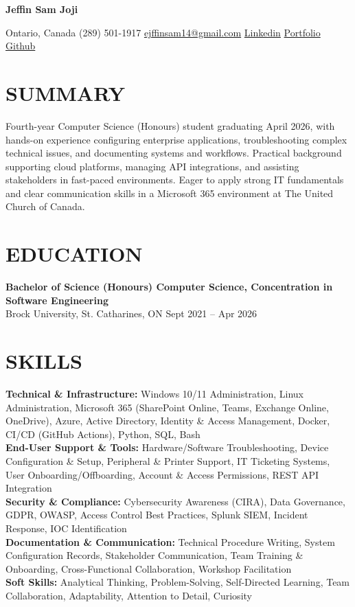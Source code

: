 \documentclass[11pt]{article}
\begin{document}
\begin{center}
    {\Huge \textbf{Jeffin Sam Joji}}

 Ontario, Canada \textbar{} (289) 501-1917 \textbar{} \href{mailto:ejffinsam14@gmail.com}{ejffinsam14@gmail.com} \textbar{} \href{https://linkedin.com/in/jeffin-sam-joji}{Linkedin} \textbar{} \href{https://jeff13in.github.io/Portfolio/}{Portfolio} \textbar{} \href{https://github.com/jeff13in}{Github}
\end{center}

\section*{SUMMARY}
Fourth-year Computer Science (Honours) student graduating April 2026, with hands-on experience configuring enterprise applications, troubleshooting complex technical issues, and documenting systems and workflows. Practical background supporting cloud platforms, managing API integrations, and assisting stakeholders in fast-paced environments. Eager to apply strong IT fundamentals and clear communication skills in a Microsoft 365 environment at The United Church of Canada.

\section*{EDUCATION}

\textbf{Bachelor of Science (Honours) Computer Science, Concentration in Software Engineering} \\
Brock University, St. Catharines, ON \hfill Sept 2021 -- Apr 2026

\section*{SKILLS}
\textbf{Technical \& Infrastructure:} Windows 10/11 Administration, Linux Administration, Microsoft 365 (SharePoint Online, Teams, Exchange Online, OneDrive), Azure, Active Directory, Identity \& Access Management, Docker, CI/CD (GitHub Actions), Python, SQL, Bash\\
\textbf{End-User Support \& Tools:} Hardware/Software Troubleshooting, Device Configuration \& Setup, Peripheral \& Printer Support, IT Ticketing Systems, User Onboarding/Offboarding, Account \& Access Permissions, REST API Integration\\
\textbf{Security \& Compliance:} Cybersecurity Awareness (CIRA), Data Governance, GDPR, OWASP, Access Control Best Practices, Splunk SIEM, Incident Response, IOC Identification\\
\textbf{Documentation \& Communication:} Technical Procedure Writing, System Configuration Records, Stakeholder Communication, Team Training \& Onboarding, Cross-Functional Collaboration, Workshop Facilitation\\
\textbf{Soft Skills:} Analytical Thinking, Problem-Solving, Self-Directed Learning, Team Collaboration, Adaptability, Attention to Detail, Curiosity
\end{document}

